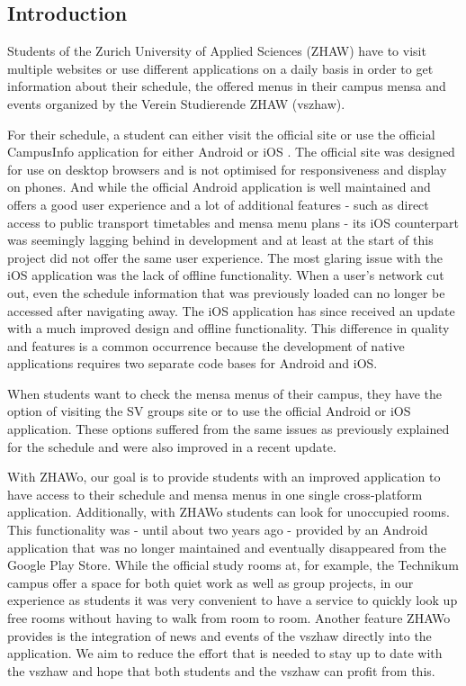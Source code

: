 \begin{markdown}
\section{Introduction} \label{introduction}

Students of the Zurich University of Applied Sciences (ZHAW) have to visit multiple websites or use different applications on a daily basis in order to get information about their schedule, the offered menus in their campus mensa and events organized by the Verein Studierende ZHAW (vszhaw).

For their schedule, a student can either visit the official site \cite{Stundenplan} or use the official CampusInfo application for either Android \cite{AppAndroid} or iOS \cite{AppIOS}. The official site was designed for use on desktop browsers and is not optimised for responsiveness and display on phones. And while the official Android application is well maintained and offers a good user experience and a lot of additional features - such as direct access to public transport timetables and mensa menu plans - its iOS counterpart was seemingly lagging behind in development and at least at the start of this project did not offer the same user experience. The most glaring issue with the iOS application was the lack of offline functionality. When a user's network cut out, even the schedule information that was previously loaded can no longer be accessed after navigating away. The iOS application has since received an update with a much improved design and offline functionality. This difference in quality and features is a common occurrence because the development of native applications requires two separate code bases for Android and iOS. 

When students want to check the mensa menus of their campus, they have the option of visiting the SV groups site \cite{SVSite} or to use the official Android or iOS application. These options suffered from the same issues as previously explained for the schedule and were also improved in a recent update.

With ZHAWo, our goal is to provide students with an improved application to have access to their schedule and mensa menus in one single cross-platform application. Additionally, with ZHAWo students can look for unoccupied rooms. This functionality was - until about two years ago - provided by an Android application that was no longer maintained and eventually disappeared from the Google Play Store. While the official study rooms at, for example, the Technikum campus offer a space for both quiet work as well as group projects, in our experience as students it was very convenient to have a service to quickly look up free rooms without having to walk from room to room. Another feature ZHAWo provides is the integration of news \cite{VszhawNews} and events \cite{VszhawCalendar} of the vszhaw directly into the application. We aim to reduce the effort that is needed to stay up to date with the vszhaw and hope that both students and the vszhaw can profit from this.


\end{markdown}
